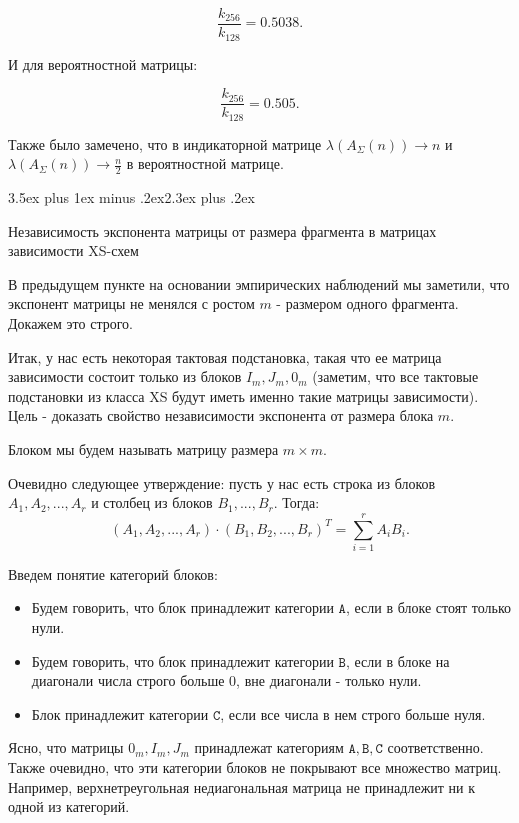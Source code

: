 \documentclass[a4paper,12pt]{report}
\makeatletter
\theoremstyle{plain} %
\theoremstyle{definition}
\theoremstyle{remark}
\renewcommand{\section}{\@startsection{section}{1}{18pt}%
{3.5ex plus 1ex minus .2ex}{2.3ex plus .2ex}%
{\normalfont\Large\bfseries\raggedright}}%
\makeatother
\begin{document}
\begin{large}
$$\frac{k_{256}}{k_{128}} = 0.5038.$$

И для вероятностной матрицы:

$$\frac{k_{256}}{k_{128}} = 0.505.$$

Также было замечено, что в индикаторной матрице $\lambda(A_{\Sigma}(n)) \rightarrow n$ и $\lambda(A_{\Sigma}(n)) \rightarrow \frac{n}{2}$ в вероятностной матрице.

\section{Независимость экспонента матрицы от размера фрагмента в матрицах зависимости XS-схем}

В предыдущем пункте на основании эмпирических наблюдений мы заметили, что экспонент матрицы не менялся с ростом $m$ - размером одного фрагмента. Докажем это строго.

Итак, у нас есть некоторая тактовая подстановка, такая что ее матрица зависимости состоит только из блоков $I_m, J_m, 0_m$ (заметим, что все тактовые подстановки из класса XS будут иметь именно такие матрицы зависимости). Цель - доказать свойство независимости экспонента от размера блока $m$.

Блоком мы будем называть матрицу размера $m \times m$.

Очевидно следующее утверждение: пусть у нас есть строка из блоков $A_1, A_2, ..., A_r$ и столбец из блоков $B_1, ..., B_r$. Тогда:
$$(A_1, A_2, ..., A_r) \cdot (B_1, B_2, ..., B_r)^T = \sum_{i=1}^r A_iB_i.$$

Введем понятие категорий блоков:

\begin{itemize}
\item Будем говорить, что блок принадлежит категории $\texttt{A}$, если в блоке стоят только нули.

\item Будем говорить, что блок принадлежит категории $\texttt{B}$, если в блоке на диагонали числа строго больше 0, вне диагонали - только нули.

\item Блок принадлежит категории $\texttt{C}$, если все числа в нем строго больше нуля.
\end{itemize}
Ясно, что матрицы $0_m, I_m, J_m$ принадлежат категориям $\texttt{A}, \texttt{B}, \texttt{C}$ соответственно. Также очевидно, что эти категории блоков не покрывают все множество матриц. Например, верхнетреугольная недиагональная матрица не принадлежит ни к одной из категорий.


\end{large}
\end{document}
